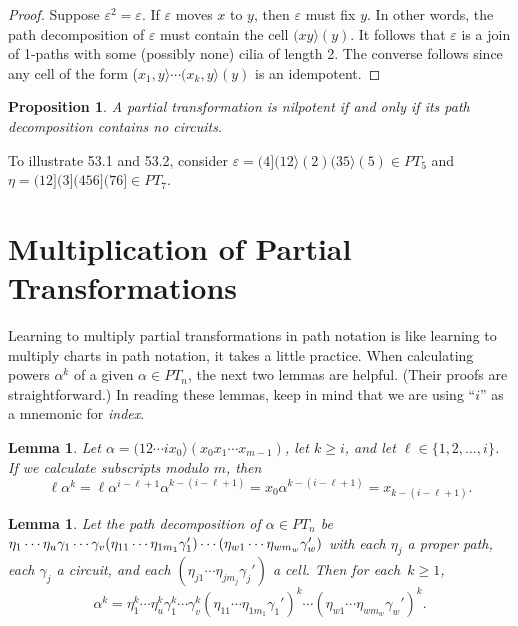 \documentclass{surv-l}
\numberwithin{equation}{section}
\numberwithin{table}{section}
\numberwithin{figure}{section}
\newtheorem{lemma}[equation]{Lemma}
\newtheorem{proposition}[equation]{Proposition}
\theoremstyle{definition}
\begin{document}
\begin{proof}Suppose $\varepsilon^{2}=\varepsilon$. If $\varepsilon$ moves $x$ to
$y$, then $\varepsilon$ must fix $y$. In other words, the path
decomposition of $\varepsilon$ must contain the cell
$(xy\rangle(y)$. It follows that $\varepsilon$ is a join of
1-paths with some (possibly none) cilia of length 2. The converse
follows since any cell of the form ($x_{1}, y\rangle \cdots(x_{k},
y\rangle(y)$ is an idempotent.
\end{proof}

\begin{proposition}\label{prop11.53.2}
A partial transformation is nilpotent if and only if its path
decomposition contains no circuits.
\end{proposition}

To illustrate 53.1 and 53.2, consider
$\varepsilon=(4](12\rangle(2)(35\rangle(5)\in PT_{5}$ and
$\eta=(12](3](456](76]\in PT_{7}$.

\section{Multiplication of Partial Transformations}\label{sec11.54}

Learning to multiply partial transformations in path notation is
like learning to multiply charts in path notation, it takes a
little practice. When calculating powers $\alpha^{k}$ of a given
$\alpha\in PT_{n}$, the next two lemmas are helpful. (Their proofs
are straightforward.) In reading these lemmas, keep in mind that
we are using ``$i$'' as a mnemonic for \emph{index}.

\begin{lemma}\label{lem11.54.1}
Let $\alpha=(12\cdots ix_{0}\rangle(x_{0}x_{1}\cdots x_{m-1})$,
let $k\geq i$, and let $\ell\in\{1,2,\ldots, i\}$. If we calculate
subscripts modulo $m$, then
\[
\ell\alpha^{k}=\ell\alpha^{i-\ell+1}\alpha^{k-(i-\ell+1)}=x_{0}\alpha^{k-(i-\ell+1)}=x_{k-(i-\ell+1)}.
\]
\end{lemma}

\begin{lemma}\label{lem11.54.2}
Let the path decomposition of $\alpha\in
PT_{n}$ be
$\eta_{1}\cdots\eta_{u}\gamma_{1}\cdots\gamma_{v}(\eta_{11}\cdots\eta_{1m_{1}}\gamma_{1}')\break\cdots
(\eta_{w1}\cdots\eta_{wm_{w}}\gamma_{w}')$ with each $\eta_{j}$ a
proper path, each $\gamma_{j}$ a circuit, and each
$(\eta_{j1}\cdots\eta_{jm_{j}}\gamma_{j}')$ a cell. Then for
each~$k\geq 1$,
\[
\alpha^{k}=\eta_{1}^{k}\cdots\eta_{u}^{k}\gamma_{1}^{k}\cdots\gamma_{v}^{k}
(\eta_{11}\cdots\eta_{1m_{1}}\gamma_{1}')^{k}\cdots(\eta_{w1}\cdots\eta_{wm_{w}}\gamma_{w}')^{k}.
\]
\end{lemma}
\end{document}
